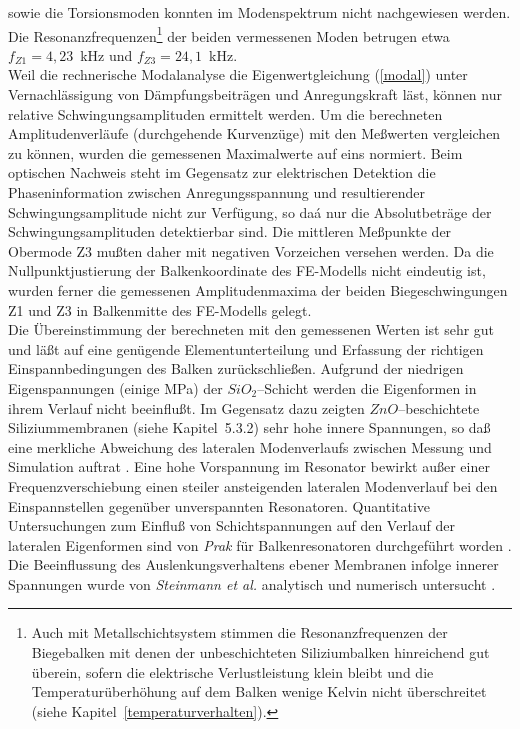 sowie die Torsionsmoden konnten im Modenspektrum nicht nachgewiesen
werden. Die Resonanzfrequenzen\footnote{Auch mit Metallschichtsystem
stimmen die Resonanzfrequenzen der Biegebalken mit denen der unbeschichteten
Siliziumbalken hinreichend gut überein, sofern die elektrische
Verlustleistung klein bleibt und die Temperaturüberhöhung auf dem Balken
wenige Kelvin nicht überschreitet (siehe Kapitel~\ref{temperaturverhalten}).}
der beiden vermessenen Moden betrugen etwa $f_{Z1} = 4,23$~kHz und
$f_{Z3} = 24,1$~kHz.\\
Weil die rechnerische Modalanalyse
die Eigenwertgleichung (\ref{modal}) unter Vernachlässigung von
Dämpfungsbeiträgen und Anregungskraft läst, können nur relative
Schwingungsamplituden ermittelt werden. Um die berechneten
Amplitudenverläufe (durchgehende Kurvenzüge) mit den Meßwerten vergleichen
zu können, wurden die gemessenen Maximalwerte auf eins normiert.
Beim optischen Nachweis steht im Gegensatz zur elektrischen Detektion
die Phaseninformation zwischen
Anregungsspannung und resultierender Schwingungsamplitude nicht zur
Verfügung, so daá nur die Absolutbeträge der Schwingungsamplituden
detektierbar sind. Die mittleren Meßpunkte der Obermode Z3 mußten daher
mit negativen Vorzeichen versehen werden.
Da die Nullpunktjustierung der Balkenkoordinate des FE-Modells nicht
eindeutig ist, wurden ferner die gemessenen Amplitudenmaxima der beiden
Biegeschwingungen Z1 und Z3 in Balkenmitte des FE-Modells gelegt.\\
%
Die Übereinstimmung der berechneten mit den gemessenen Werten ist sehr gut
und läßt auf eine genügende Elementunterteilung und Erfassung der
richtigen Einspannbedingungen des Balken zurückschließen. Aufgrund der
niedrigen Eigenspannungen (einige MPa) der $SiO_{2}$--Schicht werden die
Eigenformen in ihrem Verlauf nicht beeinflußt. Im Gegensatz dazu zeigten
$ZnO$--beschichtete Siliziummembranen (siehe Kapitel~5.3.2) sehr hohe innere
Spannungen, so daß eine merkliche Abweichung des lateralen Modenverlaufs
zwischen Messung und Simulation auftrat \cite{Fab92b}. Eine hohe Vorspannung
im Resonator bewirkt außer einer
Frequenzverschiebung einen steiler ansteigenden lateralen Modenverlauf bei
den Einspannstellen gegenüber unverspannten Resonatoren.
Quantitative Untersuchungen zum Einfluß von
Schichtspannungen auf den Verlauf der lateralen Eigenformen sind von
{\sl Prak} für Balkenresonatoren durchgeführt worden \cite{Pra93}. Die
Beeinflussung des Auslenkungsverhaltens ebener Membranen infolge innerer
Spannungen wurde von {\sl Steinmann et al.} analytisch und numerisch
untersucht \cite{Ste93}.

